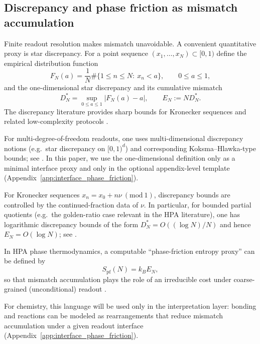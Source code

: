 \subsection{Discrepancy and phase friction as mismatch accumulation}
Finite readout resolution makes mismatch unavoidable. A convenient quantitative proxy is star discrepancy. For a point sequence $(x_1,\dots,x_N)\subset[0,1)$ define the empirical distribution function
\begin{equation}
F_N(a)=\frac{1}{N}\#\{1\le n\le N:\ x_n<a\},\qquad 0\le a\le 1,
\end{equation}
and the one-dimensional star discrepancy and its cumulative mismatch
\begin{equation}
D_N^\ast=\sup_{0\le a\le 1}\left|F_N(a)-a\right|,
\qquad
E_N:=N D_N^\ast.
\end{equation}
The discrepancy literature provides sharp bounds for Kronecker sequences and related low-complexity protocols \cite{KuipersNiederreiter1974,DrmotaTichy1997}.

\begin{remark}
For multi-degree-of-freedom readouts, one uses multi-dimensional discrepancy notions (e.g.\ star discrepancy on $[0,1)^d$) and corresponding Koksma--Hlawka-type bounds; see \cite{KuipersNiederreiter1974,DrmotaTichy1997}. In this paper, we use the one-dimensional definition only as a minimal interface proxy and only in the optional appendix-level template (Appendix~\ref{app:interface_phase_friction}).
\end{remark}

\begin{remark}
For Kronecker sequences $x_n=x_0+n\nu\ (\mathrm{mod}\ 1)$, discrepancy bounds are controlled by the continued-fraction data of $\nu$. In particular, for bounded partial quotients (e.g.\ the golden-ratio case relevant in the HPA literature), one has logarithmic discrepancy bounds of the form $D_N^\ast=O((\log N)/N)$ and hence $E_N=O(\log N)$; see \cite{KuipersNiederreiter1974,DrmotaTichy1997}.
\end{remark}

In HPA phase thermodynamics, a computable ``phase-friction entropy proxy'' can be defined by
\begin{equation}
S_{\mathrm{pf}}(N)=k_B E_N,
\end{equation}
so that mismatch accumulation plays the role of an irreducible cost under coarse-grained (unconditional) readout \cite{Ma2025HPT}.

For chemistry, this language will be used only in the interpretation layer: bonding and reactions can be modeled as rearrangements that reduce mismatch accumulation under a given readout interface (Appendix~\ref{app:interface_phase_friction}).


